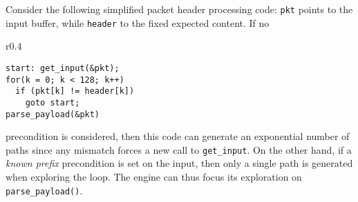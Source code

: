

\begin{shaded} Consider the following simplified packet header processing code: {\tt pkt} points to the input buffer, while {\tt header} to the fixed expected content. If no
\begin{wrapfigure}{r}{0.4\textwidth}
  \vspace{-4.2mm}
  \begin{lstlisting}[basicstyle=\ttfamily\small]
start: get_input(&pkt);
for(k = 0; k < 128; k++)
  if (pkt[k] != header[k])
    goto start;
parse_payload(&pkt)
\end{lstlisting}
\vspace{-5.8mm}
\end{wrapfigure}
precondition is considered, then this code can generate an exponential number of paths since any mismatch forces a new call to {\tt get\_input}. On the other hand, if a {\em known prefix} precondition is set on the input, then only a single path is generated when exploring the loop. The engine can thus focus its exploration on {\tt parse\_payload()}.
\end{shaded}

